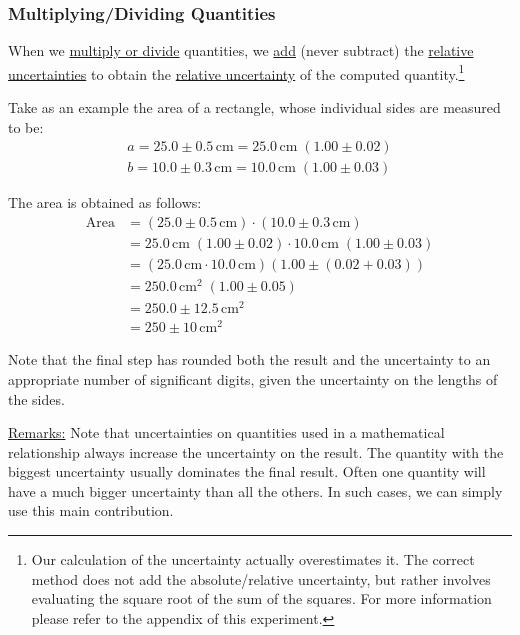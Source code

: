 \documentclass{article}
\begin{document}
\subsubsection{Multiplying/Dividing Quantities}

When we \underline{multiply or divide} quantities, we \underline{add} (never subtract) the \underline{relative uncertainties} to obtain the \underline{relative uncertainty} of the computed quantity.\footnote{Our calculation of the uncertainty actually overestimates it. The correct method does not add the absolute/relative uncertainty, but rather involves evaluating the square root of the sum of the squares. For more information please refer to the appendix of this experiment.}

Take as an example the area of a rectangle, whose individual sides are measured to be: 
\begin{align}
    a = 25.0\pm 0.5\,\mathrm{cm} = 25.0\,\mathrm{cm}\;(1.00\pm 0.02) \nonumber \\
    b = 10.0\pm 0.3\,\mathrm{cm} = 10.0\,\mathrm{cm}\;(1.00\pm 0.03)
\end{align}

The area is obtained as follows:
\begin{equation}
    \begin{split}
        \text{Area} &= \left( 25.0\pm 0.5\,\mathrm{cm} \right)\cdot\left( 10.0\pm 0.3\,\mathrm{cm} \right) \\
        &= 25.0\,\mathrm{cm}\;\left( 1.00\pm 0.02 \right)\cdot 10.0\,\mathrm{cm}\;\left( 1.00\pm 0.03 \right) \\
        &= \left( 25.0\,\mathrm{cm}\cdot 10.0\,\mathrm{cm} \right)\left( 1.00\pm \left( 0.02 + 0.03 \right) \right) \\
        &= 250.0\,\mathrm{cm}^2\;(1.00 \pm 0.05) \\
        &= 250.0\pm 12.5\,\mathrm{cm}^2 \\
        &= 250 \pm 10\,\mathrm{cm}^2
    \end{split}
\end{equation}

Note that the final step has rounded both the result and the uncertainty to an appropriate number of significant digits, given the uncertainty on the lengths of the sides. \myskip

\underline{Remarks:} Note that uncertainties on quantities used in a mathematical relationship always increase the uncertainty on the result. The quantity with the biggest uncertainty usually dominates the final result. Often one quantity will have a much bigger uncertainty than all the others. In such cases, we can simply use this main contribution. \myskip
\end{document}

